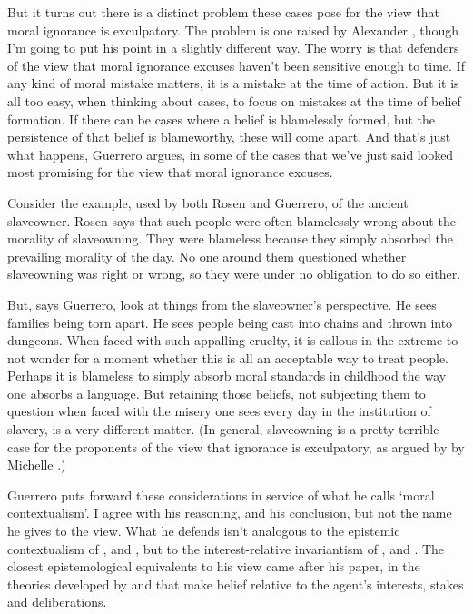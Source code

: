 But it turns out there is a distinct problem these cases pose for the view that moral ignorance is exculpatory. The problem is one raised by \gls{Alex}ander \citet{Guerrero2007}, though I'm going to put his point in a slightly different way. The worry is that defenders of the view that moral ignorance excuses haven't been sensitive enough to time. If any kind of moral mistake matters, it is a mistake at the time of action. But it is all too easy, when thinking about cases, to focus on mistakes at the time of belief formation. If there can be cases where a belief is blamelessly formed, but the persistence of that belief is blameworthy, these will come apart. And that's just what happens, Guerrero argues, in some of the cases that we've just said looked most promising for the view that moral ignorance excuses.

Consider the example, used by both Rosen and Guerrero, of the ancient slaveowner. Rosen says that such people were often blamelessly wrong about the morality of slaveowning. They were blameless because they simply absorbed the prevailing morality of the day. No one around them questioned whether slaveowning was right or wrong, so they were under no obligation to do so either.

But, says Guerrero, look at things from the slaveowner's perspective. He sees families being torn apart. He sees people being cast into chains and thrown into dungeons. When faced with such appalling cruelty, it is callous in the extreme to not wonder for a moment whether this is all an acceptable way to treat people. Perhaps it is blameless to simply absorb moral standards in childhood the way one absorbs a language. But retaining those beliefs, not subjecting them to question when faced with the misery one sees every day in the institution of slavery, is a very different matter. (In general, slaveowning is a pretty terrible case for the proponents of the view that ignorance is exculpatory, as argued by by Michelle \citet{MoodyAdams1994}.)

Guerrero puts forward these considerations in service of what he calls `moral contextualism'. I agree with his reasoning, and his conclusion, but not the name he gives to the view. What he defends isn't analogous to the epistemic contextualism of \citet{Cohen1986}, \citet{DeRose1995} and \citet{Lewis1996b}, but to the interest-relative invariantism of \citet{Stanley2005}, and \citet{FantlMcGrath2009}. The closest epistemological equivalents to his view came after his paper, in the theories developed by \citet{Ganson2008} and \citet{Weatherson2012} that make belief relative to the agent's interests, stakes and deliberations.

